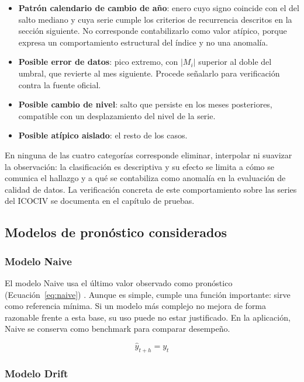 \documentclass[12pt,letterpaper]{article}
\providecommand{\parencite}{\citep}
\newcommand{\ICOCIV}{ICOCIV}
\begin{document}
\begin{itemize}
  \item \textbf{Patrón calendario de cambio de año}: enero cuyo signo coincide con el del salto mediano y cuya serie cumple los criterios de recurrencia descritos en la sección siguiente. No corresponde contabilizarlo como valor atípico, porque expresa un comportamiento estructural del índice y no una anomalía.
  \item \textbf{Posible error de datos}: pico extremo, con $|M_i|$ superior al doble del umbral, que revierte al mes siguiente. Procede señalarlo para verificación contra la fuente oficial.
  \item \textbf{Posible cambio de nivel}: salto que persiste en los meses posteriores, compatible con un desplazamiento del nivel de la serie.
  \item \textbf{Posible atípico aislado}: el resto de los casos.
\end{itemize}

En ninguna de las cuatro categorías corresponde eliminar, interpolar ni suavizar la observación: la clasificación es descriptiva y su efecto se limita a cómo se comunica el hallazgo y a qué se contabiliza como anomalía en la evaluación de calidad de datos. La verificación concreta de este comportamiento sobre las series del \ICOCIV{} se documenta en el capítulo de pruebas.

\subsection{Modelos de pronóstico considerados}

\subsubsection{Modelo Naive}

El modelo Naive usa el último valor observado como pronóstico (Ecuación~\ref{eq:naive}) \parencite{hyndman2021fpp3}. Aunque es simple, cumple una función importante: sirve como referencia mínima. Si un modelo más complejo no mejora de forma razonable frente a esta base, su uso puede no estar justificado. En la aplicación, Naive se conserva como benchmark para comparar desempeño.

\begin{equation}
\hat{y}_{t+h}=y_t
\label{eq:naive}
\end{equation}

\subsubsection{Modelo Drift}
\end{document}
